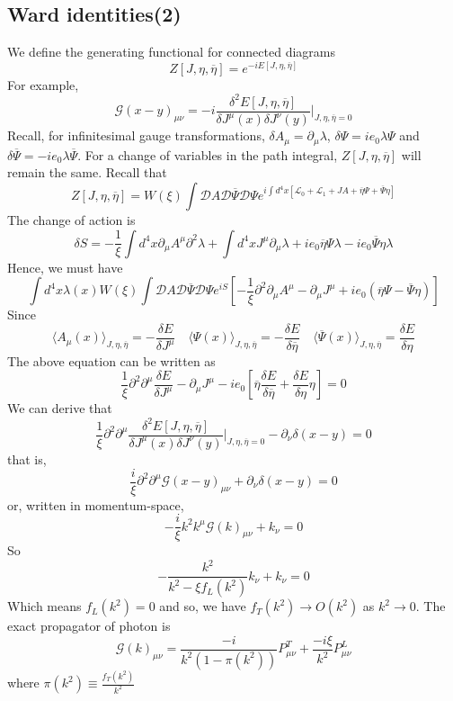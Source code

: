 \subsection{Ward identities(2)}
\noindent
We define the generating functional for connected diagrams
\[Z[J,\eta,\overline{\eta}] = e^{-iE[J,\eta,\overline{\eta}]}\]
For example,
\[\mathcal{G}(x-y)_{\mu\nu} = -i  \frac{\delta^2 E[J,\eta,\overline{\eta}]}{\delta J^{\mu}(x) \delta J^{\nu}(y)}\bigg|_{J,\eta,\overline{\eta}=0}\]
Recall, for infinitesimal gauge transformations, $\delta A_{\mu} = \partial_{\mu} \lambda $, $\delta \Psi = ie_0\lambda\Psi$ and $\delta \overline{\Psi}  = -ie_0 \lambda \overline{\Psi}$. For a change of
variables in the path integral, $Z[J,\eta,\overline{\eta}]$ will remain the same. 
Recall that
\[Z[J,\eta,\overline{\eta}] = W(\xi) \int \mathcal{D}A \mathcal{D}\overline{\Psi} \mathcal{D}\Psi e^{i\int d^4x [\mathcal{L}_0 + \mathcal{L}_1 + JA + \overline{\eta}\Psi + \overline{\Psi}\eta]} \]
The change of action is
\[\delta S = -\frac{1}{\xi} \int d^4x \partial_{\mu} A^{\mu} \partial^2 \lambda + \int d^4x J^{\mu}\partial_{\mu}\lambda + ie_0\overline{\eta}\Psi\lambda - ie_0\overline{\Psi}\eta\lambda\]
Hence, we must have
\[\int d^4x \lambda(x) W(\xi)\int \mathcal{D}A \mathcal{D}\overline{\Psi} \mathcal{D}\Psi e^{iS} \left[ -\frac{1}{\xi} \partial^2 \partial_{\mu} A^{\mu} - \partial_{\mu}J^{\mu}  + ie_0(\overline{\eta}\Psi - \overline{\Psi}\eta)\right] \]
Since
\[\langle A_{\mu}(x) \rangle_{J,\eta,\overline{\eta}} = - \frac{\delta E}{\delta J^{\mu}} \quad \langle \Psi(x) \rangle_{J,\eta,\overline{\eta}} = - \frac{\delta E}{\delta \overline{\eta}} \quad \langle \overline{\Psi}(x) \rangle_{J,\eta,\overline{\eta}} =  \frac{\delta E}{\delta \eta}\]
The above equation can be written as
\[\frac{1}{\xi} \partial^2 \partial^{\mu}\frac{\delta E}{\delta J^{\mu}} - \partial_{\mu}J^{\mu} - ie_0\left[ \overline{\eta}\frac{\delta E}{\delta \overline{\eta}} + \frac{\delta E}{\delta \eta} \eta \right]=0\]
We can derive that
\[\frac{1}{\xi} \partial^2 \partial^{\mu} \frac{\delta^2 E[J,\eta,\overline{\eta}]}{\delta J^{\mu}(x) \delta J^{\nu}(y)}\bigg|_{J,\eta,\overline{\eta}=0} - \partial_{\nu} \delta(x-y) = 0\]
that is,
\[\frac{i}{\xi}\partial^2 \partial^{\mu} \mathcal{G}(x-y)_{\mu\nu}+ \partial_{\nu} \delta(x-y) = 0 \]
or, written in momentum-space,
\[-\frac{i}{\xi}k^2 k^{\mu} \mathcal{G}(k)_{\mu\nu}+ k_{\nu} = 0\]
So
\[- \frac{k^2}{k^2-\xi f_L(k^2)} k_{\nu} + k_{\nu} = 0\]
Which means $f_L(k^2) =0$ and so, we have $f_T(k^2) \to O(k^2)$ as $k^2 \to 0$. The exact propagator of photon is
\[\mathcal{G}(k)_{\mu\nu} = \frac{-i}{k^2(1-\pi(k^2))}P^T_{\mu\nu} + \frac{-i\xi}{k^2} P^L_{\mu\nu}\]
where $\pi(k^2) \equiv \frac{f_T(k^2)}{k^2}$

